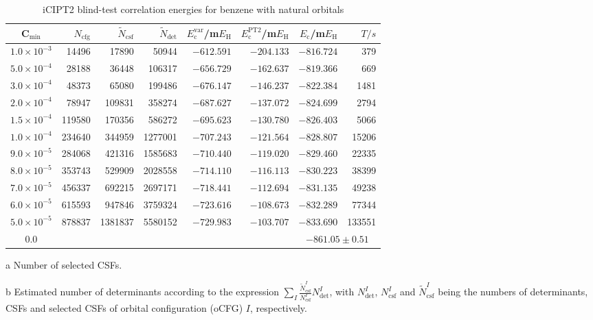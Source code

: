 \documentclass[journal=jcp,manuscript=suppinfo]{achemso}
\begin{document}
\begin{table}[!htp]
	\small
\caption{iCIPT2 blind-test correlation energies for benzene with natural orbitals }
	\begin{threeparttable}
		\centering
	\begin{tabular}{c|rrrrrrr}\toprule
		C$_{\text{min}}$&$N_{\mathrm{cfg}}$&$\tilde{N}_{\mathrm{csf}}$\tnote{a}&$\tilde{N}_{\mathrm{det}}$\tnote{b}
		&$E_{\mathrm{c}}^{\mathrm{var}}$/m$E_{\text{H}}$&$E_{\mathrm{c}}^{\mathrm{PT2}}$/m$E_{\text{H}}$&$E_{\mathrm{c}}$/m$E_{\text{H}}$&$T/s$\tnote{c}\\\toprule
			$1.0\times10^{-3}$ &    14496 &    17890 &  50944&  $-612.591$  &  $-204.133$&  $-816.724$ &379\\
			$5.0\times10^{-4}$ &    28188 &    36448 & 106317&  $-656.729$  &  $-162.637$&  $-819.366$ &669\\
			$3.0\times10^{-4}$ &    48373 &    65080 & 199486&  $-676.147$  &  $-146.237$&  $-822.384$ &1481\\
			$2.0\times10^{-4}$ &    78947 &   109831 & 358274&  $-687.627$  &  $-137.072$&  $-824.699$ &2794\\
			$1.5\times10^{-4}$ &   119580 &   170356 & 586272&  $-695.623$  &  $-130.780$&  $-826.403$ &5066\\
			$1.0\times10^{-4}$ &   234640 &   344959 &1277001&  $-707.243$  &  $-121.564$&  $-828.807$ &15206\\
			$9.0\times10^{-5}$ &   284068 &   421316 &1585683&  $-710.440$  &  $-119.020$&  $-829.460$ &22335\\
			$8.0\times10^{-5}$ &   353743 &   529909 &2028558&  $-714.110$  &  $-116.113$&  $-830.223$ &38399\\
			$7.0\times10^{-5}$ &   456337 &   692215 &2697171&  $-718.441$  &  $-112.694$&  $-831.135$ &49238\\
			$6.0\times10^{-5}$ &   615593 &   947846 &3759324&  $-723.616$  &  $-108.673$&  $-832.289$ &77344\\
			$5.0\times10^{-5}$ &   878837 &  1381837 &5580152&  $-729.983$  &  $-103.707$&  $-833.690$ &133551\\\midrule
			0.0\tnote{b}&&&&&&\multicolumn{2}{c}{$-861.05\pm0.51$}\\\bottomrule
		\end{tabular}
\begin{tablenotes}
\item[a]Number of selected CSFs.
\item[b]Estimated number of determinants according to the expression $\sum_I\frac{\tilde{N}_{\mathrm{csf}}^I}{N_{\mathrm{csf}}^I}N_{\mathrm{det}}^I$, with $N_{\mathrm{det}}^I$, $N_{\mathrm{csf}}^I$ and $\tilde{N}_{\mathrm{csf}}^I$ being the numbers of determinants, CSFs and selected CSFs of orbital configuration (oCFG) $I$, respectively.

\end{tablenotes}
\end{threeparttable}
\end{table}
\end{document}
